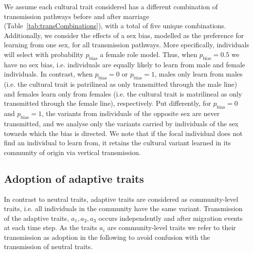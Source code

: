 \documentclass[9pt,twocolumn,twoside,lineno]{pnas-new}
\begin{document}
We assume each cultural trait considered has a different combination of transmission pathways before and after marriage (Table~\ref{tab:transCombinations}), with a total of five unique combinations. 
Additionally, we consider the effects of a sex bias, modelled as the preference for learning from one sex, for all transmission pathways.
More specifically, individuals will select with probability $p_\text{bias}$ a female role model.   
Thus, when $p_\text{bias}=0.5$ we have no sex bias, i.e. individuals are equally likely to learn from male and female individuals.
In contrast, when $p_\text{bias}=0$ or $p_\text{bias}=1$, males only learn from males (i.e. the cultural trait is patrilineal as only transmitted through the male line) and females learn only from females (i.e. the cultural trait is matrilineal as only transmitted through the female line), respectively.
Put differently, for $p_{\text{bias}} = 0$ and $p_{\text{bias}} = 1$, the variants from individuals of the opposite sex are never transmitted, and we analyse only the variants carried by individuals of the sex towards which the bias is directed.
We note that if the focal individual does not find an individual to learn from, it retains the cultural variant learned in its community of origin via vertical transmission. 

\subsection*{Adoption of adaptive traits}

In contrast to neutral traits, adaptive traits are considered as community-level traits, i.e. all individuals in the community have the same variant. 
Transmission of the adaptive traits, $a_1,a_2, a_3$ occurs independently and after migration events at each time step. As the traits $a_i$ are community-level traits we refer to their transmission as adoption in the following to avoid confusion with the transmission of neutral traits.  
\end{document}
